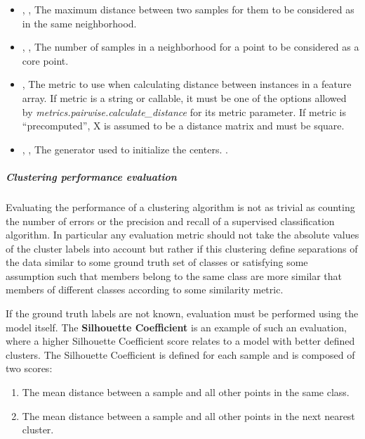 \begin{itemize}
	\item {}, , The maximum
	distance between two samples for them to be considered as in the
	 same neighborhood. 
	\item {}, ,
	The number of samples in a neighborhood for a point to be
	considered as a core point. 
	\item {}, 
	The metric to use when calculating distance between instances in
	 a feature array. If metric is a string or callable, it must be one
	of the options allowed by \textit{metrics.pairwise.calculate\_distance}
	 for its metric parameter. If metric is “precomputed”, X is assumed
	 to be a distance matrix and must be square. 
	\item {}, , The generator used to initialize the centers.
	.
\end{itemize}

\subparagraph{Clustering performance evaluation} \hfill
\label{subparagraph:ClusterPerformance}

Evaluating the performance of a clustering algorithm is not as trivial as
counting the number of errors or the precision and recall of a supervised
 classification algorithm. In particular any evaluation metric should not
 take the absolute values of the cluster labels into account but rather if
 this clustering define separations of the data similar to some ground truth
 set of classes or satisfying some assumption such that members belong to
the same class are more similar that members of different classes according
to some similarity metric.

If the ground truth labels are not known, evaluation must be performed using
 the model itself. The \textbf{Silhouette Coefficient} is an example of
such an evaluation, where a higher Silhouette Coefficient score relates to
 a model with better defined clusters. The Silhouette Coefficient is defined
 for each sample and is composed of two scores:
\begin{enumerate}
	\item The mean distance between a sample and all other points in the
	 same class.
	\item The mean distance between a sample and all other points in the
	 next nearest cluster.
\end{enumerate}

